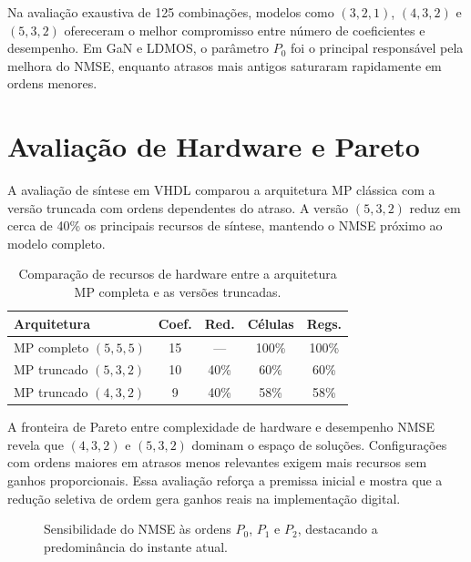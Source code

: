 \documentclass[sigconf]{acmart}
\begin{document}
Na avalia\c{c}\~ao exaustiva de 125 combina\c{c}\~oes, modelos como $(3,2,1)$, $(4,3,2)$ e $(5,3,2)$ ofereceram o melhor compromisso entre n\'umero de coeficientes e desempenho. Em GaN e LDMOS, o par\^ametro $P_0$ foi o principal respons\'avel pela melhora do NMSE, enquanto atrasos mais antigos saturaram rapidamente em ordens menores.

\section{Avalia\c{c}\~ao de Hardware e Pareto}
A avalia\c{c}\~ao de s\'intese em VHDL comparou a arquitetura MP cl\'assica com a vers\~ao truncada com ordens dependentes do atraso. A vers\~ao $(5,3,2)$ reduz em cerca de 40\% os principais recursos de s\'intese, mantendo o NMSE pr\'oximo ao modelo completo.

\begin{table}[t]
  \caption{Compara\c{c}\~ao de recursos de hardware entre a arquitetura MP completa e as vers\~oes truncadas.}
  \label{tab:hardware}
  \centering
  \begin{tabular}{p{2.2cm} c c c c}
    \toprule
    \textbf{Arquitetura} & \textbf{Coef.} & \textbf{Red.} & \textbf{C\'elulas} & \textbf{Regs.} \\
    \midrule
    MP completo $(5,5,5)$ & 15 & --- & 100\% & 100\% \\
    MP truncado $(5,3,2)$ & 10 & 40\% & 60\% & 60\% \\
    MP truncado $(4,3,2)$ & 9 & 40\% & 58\% & 58\% \\
    \bottomrule
  \end{tabular}
\end{table}

A fronteira de Pareto entre complexidade de hardware e desempenho NMSE revela que $(4,3,2)$ e $(5,3,2)$ dominam o espa\c{c}o de solu\c{c}\~oes. Configura\c{c}\~oes com ordens maiores em atrasos menos relevantes exigem mais recursos sem ganhos proporcionais. Essa avalia\c{c}\~ao refor\c{c}a a premissa inicial e mostra que a redu\c{c}\~ao seletiva de ordem gera ganhos reais na implementa\c{c}\~ao digital.

\begin{figure}[t]
  \centering
  \caption{Sensibilidade do NMSE \`as ordens $P_0$, $P_1$ e $P_2$, destacando a predomin\^ancia do instante atual.}
  \label{fig:sensibilidade}
\end{figure}
\end{document}
